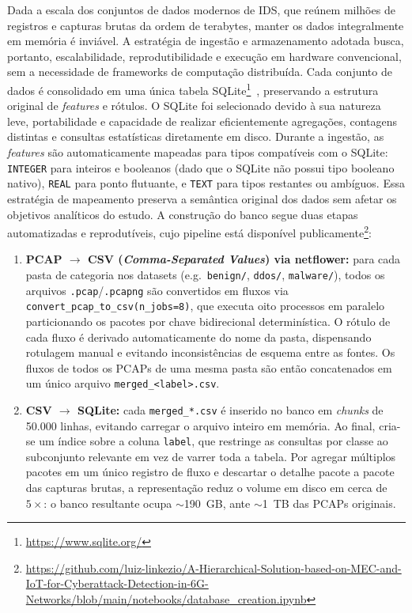 \documentclass[12pt]{article}
\begin{document}
Dada a escala dos conjuntos de dados modernos de IDS, que reúnem milhões de registros e capturas brutas da ordem de terabytes, manter os dados integralmente em memória é inviável. A estratégia de ingestão e armazenamento adotada busca, portanto, escalabilidade, reprodutibilidade e execução em hardware convencional, sem a necessidade de frameworks de computação distribuída. Cada conjunto de dados é consolidado em uma única tabela SQLite\footnote{\url{https://www.sqlite.org/}}~\cite{sqlite}, preservando a estrutura original de \textit{features} e rótulos. O SQLite foi selecionado devido à sua natureza leve, portabilidade e capacidade de realizar eficientemente agregações, contagens distintas e consultas estatísticas diretamente em disco. Durante a ingestão, as \textit{features} são automaticamente mapeadas para tipos compatíveis com o SQLite: \texttt{INTEGER} para inteiros e booleanos (dado que o SQLite não possui tipo booleano nativo), \texttt{REAL} para ponto flutuante, e \texttt{TEXT} para tipos restantes ou ambíguos. Essa estratégia de mapeamento preserva a semântica original dos dados sem afetar os objetivos analíticos do estudo. A construção do banco segue duas etapas automatizadas e reprodutíveis, cujo pipeline está disponível publicamente\footnote{\url{https://github.com/luiz-linkezio/A-Hierarchical-Solution-based-on-MEC-and-IoT-for-Cyberattack-Detection-in-6G-Networks/blob/main/notebooks/database_creation.ipynb}}:

\begin{enumerate}
  \item \textbf{PCAP $\rightarrow$ CSV (\textit{Comma-Separated Values}) via netflower:} para cada pasta de categoria
    nos datasets (e.g.\ \texttt{benign/}, \texttt{ddos/}, \texttt{malware/}), todos
    os arquivos \texttt{.pcap}/\texttt{.pcapng} são convertidos em fluxos via
    \texttt{convert\_pcap\_to\_csv(n\_jobs=8)}, que executa oito processos em
    paralelo particionando os pacotes por chave bidirecional determinística. O
    rótulo de cada fluxo é derivado automaticamente do nome da pasta, dispensando
    rotulagem manual e evitando inconsistências de esquema entre as fontes. Os fluxos
    de todos os PCAPs de uma mesma pasta são então concatenados em um único arquivo
    \texttt{merged\_<label>.csv}.
  \item \textbf{CSV $\rightarrow$ SQLite:} cada \texttt{merged\_*.csv} é inserido no
    banco em \textit{chunks} de 50.000 linhas, evitando carregar o arquivo inteiro
    em memória. Ao final, cria-se um índice sobre a coluna \texttt{label}, que
    restringe as consultas por classe ao subconjunto relevante em vez de varrer toda
    a tabela. Por agregar múltiplos pacotes em um único registro de fluxo e descartar
    o detalhe pacote a pacote das capturas brutas, a representação reduz o volume em
    disco em cerca de $5\times$: o banco resultante ocupa $\sim$190~GB, ante
    $\sim$1~TB das PCAPs originais.
\end{enumerate}
\end{document}
